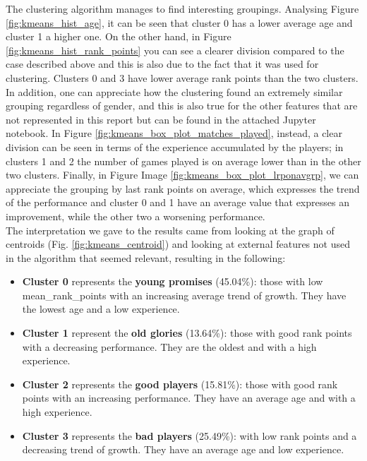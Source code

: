 The clustering algorithm manages to find interesting groupings. Analysing Figure \ref{fig:kmeans_hist_age}, it can be seen that cluster 0 has a lower average age and cluster 1 a higher one. 
On the other hand, in Figure \ref{fig:kmeans_hist_rank_points} you can see a clearer division compared to the case described above and this is also due to the fact that it was used for clustering. Clusters 0 and 3 have lower average rank points than the two clusters. In addition, one can appreciate how the clustering found an extremely similar grouping regardless of gender, and this is also true for the other features that are not represented in this report but can be found in the attached Jupyter notebook.
In Figure \ref{fig:kmeans_box_plot_matches_played}, instead, a clear division can be seen in terms of the experience accumulated by the players; in clusters 1 and 2 the number of games played is on average lower than in the other two clusters. 
Finally, in Figure Image \ref{fig:kmeans_box_plot_lrponavgrp}, we can appreciate the grouping by last rank points on average, which expresses the trend of the performance and cluster 0 and 1 have an average value that expresses an improvement, while the other two a worsening performance.
\\
The interpretation we gave to the results came from looking at the graph of centroids (Fig. \ref{fig:kmeans_centroid}) and looking at external features not used in the algorithm that seemed relevant, resulting in the following:
\begin{itemize}
	\item{ \textbf{Cluster 0} represents the \textbf{young promises} (45.04\%): those with low mean\_rank\_points with an increasing average trend of growth. They have the lowest age and a low experience.}
	\item{ \textbf{Cluster 1} represent the \textbf{old glories} (13.64\%): those with good rank points with a decreasing performance. They are the oldest and with a high experience.}
	\item{ \textbf{Cluster 2} represents the \textbf{good players} (15.81\%): those with good rank points with an increasing performance. They have an average age and with a high experience.}
	\item{ \textbf{Cluster 3} represents the \textbf{bad players} (25.49\%): with low rank points and a decreasing trend of growth. They have an average age and low experience.}
\end{itemize}
